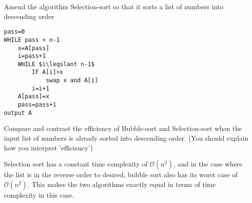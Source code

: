 \documentclass[addpoints]{exam}
\begin{document}
\begin{questions}
\droptotalpoints
\newpage
\question[3]Amend the algorithm Selection-sort so that it sorts a list of numbers into descending order
\begin{solution}[2in]
\begin{lstlisting}
pass=0
WHILE pass < n-1
	x=A[pass]
	i=pass+1
	WHILE $i\leqslant n-1$
		IF A[i]>x
			swap x and A[i]
		i=i+1
	A[pass]=x
	pass=pass+1
output A
\end{lstlisting}
\end{solution}

\question[6]Compare and contrast the efficiency of Bubble-sort and Selection-sort when the input list of numbers is already sorted into descending order. (You should explain how you interpret 'efficiency')
\begin{solution}[2in]
Selection sort has a constant time complexity of $\mathcal{O}(n^2)$, and in the case where the list is in the reverse order to desired, bubble sort also has its worst case of $\mathcal{O}(n^2)$. This makes the two algorithms exactly equal in terms of time complexity in this case.
\end{solution}


\end{questions}
\end{document}
